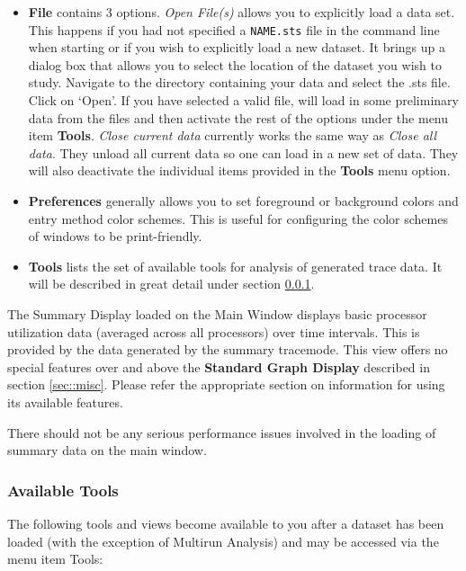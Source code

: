 \documentclass[10pt]{article}
\begin{document}
\begin{itemize}
\item
  {\bf File} contains 3 options. {\it Open File(s)} allows you to
  explicitly load a data set. This happens if you had not specified a
  {\tt NAME.sts} file in the command line when starting \projections{}
  or if you wish to explicitly load a new dataset. It brings up a
  dialog box that allows you to select the location of the dataset you
  wish to study. Navigate to the directory containing your data and
  select the .sts file.  Click on `Open'. If you have selected a valid
  file, \projections{} will load in some preliminary data from the
  files and then activate the rest of the options under the menu item
  {\bf Tools}. {\it Close current data} currently works the same way
  as {\it Close all data}. They unload all current \projections{} data
  so one can load in a new set of data. They will also deactivate the
  individual items provided in the {\bf Tools} menu option.
\item
  {\bf Preferences} generally allows you to set foreground or background
  colors and entry method color schemes. This is useful for configuring
  the color schemes of \projections{} windows to be print-friendly.
\item
  {\bf Tools} lists the set of available tools for analysis of generated
  trace data. It will be described in great detail under section
  \ref{sec::available tools}.
\end{itemize}


The Summary Display loaded on the Main Window displays basic processor
utilization data (averaged across all processors) over time
intervals. This is provided by the data generated by the summary
tracemode. This view offers no special features over and above the
{\bf Standard Graph Display} described in section \ref{sec::misc}. 
Please refer the appropriate section on information for using
its available features.


There should not be any serious performance issues involved in the
loading of summary data on the main window.

\subsubsection{Available Tools}
\label{sec::available tools}

The following tools and views become available to you after a dataset
has been loaded (with the exception of Multirun Analysis) and may be
accessed via the menu item Tools:
\end{document}
